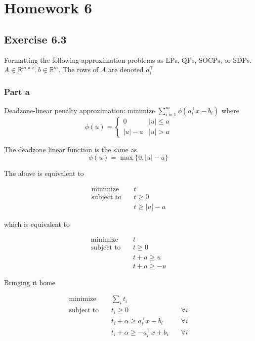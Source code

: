 \section{Homework 6}

\subsection{Exercise 6.3}
Formatting the following approximation problems as LPs, QPs, SOCPs, or SDPs. $A \in \mathbb{R}^{m \times x}, b \in \mathbb{R}^m$. The rows of $A$ are denoted $a_i^\top$

\subsubsection{Part a}
Deadzone-linear penalty approximation: minimize $\sum_{i=1}^{m} \phi(a_i^\top x - b_i)$ where
\begin{equation}
    \phi(u) = \begin{cases}
        0 & |u| \leq a \\
        |u| - a & |u| > a
    \end{cases}
\end{equation}

The deadzone linear function is the same as 
\begin{equation}
    \phi(u) = \max \{ 0 , |u| - a \}
\end{equation}

The above is equivalent to

\begin{align}
  \text{minimize} & \quad t \\
  \text{subject to} & \quad t \geq 0  \\
  & \quad t \geq |u| - a
\end{align}

which is equivalent to

\begin{align}
    \text{minimize} & \quad t \\
    \text{subject to} & \quad t \geq 0  \\
    & \quad t + a \geq u \\
    & \quad t + a \geq -u
  \end{align}

Bringing it home

\begin{align}
  \text{minimize} & \quad \sum_i t_i  \\
  \text{subject to} & \quad t_i  \geq 0 & \quad \forall i  \\
  & \quad t_i  + \alpha  \geq a_i^\top x - b_i & \quad\forall i\\
  & \quad t_i + \alpha \geq - a_i^\top x + b_i & \quad\forall i 
\end{align}

